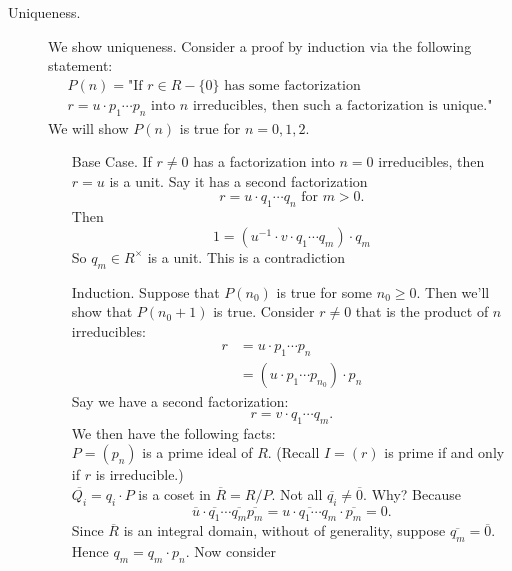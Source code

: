 \documentclass[12pt,letterpaper]{algebra_book}
\theoremstyle{definition}
\begin{document}
\begin{prf}
\begin{description}
        \item[Uniqueness.] We show uniqueness. Consider a proof by
        induction via the following statement:
        \begin{align*}
            P(n) = \text{"If } r \in R - \{0\} \text{ has some factorization }\\ 
            r=u\cdot p_1\cdots p_n \text{ into }  n
            \text{ irreducibles, then such a factorization is unique."}
        \end{align*}
        We will show $P(n)$ is true for $n=0,1,2$. 
        \begin{itemize}
            \item[Base Case.] If $r \ne 0$ has a factorization into
            $n = 0$ irreducibles, then $r = u$ is a unit. Say it
            has a second factorization 
            \[
                r = u \cdot q_1 \cdots q_n \text{  for } m>0.
            \]
            Then 
            \[
                1 = (u^{-1}\cdot v \cdot q_1 \cdots q_m)\cdot q_m
            \]
            So $q_m \in R^{\times}$ is a unit. This is a contradiction
            \item[Induction.] 
            Suppose that $P(n_0)$ is true for some $n_0 \ge 0$.
            Then we'll show that $P(n_0 + 1)$ is true. Consider $r
            \ne 0$ that is the product of $n$ irreducibles: 
            \begin{align*}
                r & = u \cdot p_1 \cdots p_n\\
                & = (u \cdot p_1 \cdots p_{n_0}) \cdot p_n
            \end{align*}
            Say we have a second factorization:
            \[
                r = v \cdot q_1 \cdots q_m.
            \]
            We then have the following facts:\\
            $P = (p_n)$ is a prime ideal of $R$. (Recall $I = (r)$
            is prime if and only if $r$ is irreducible.)\\
            $\overline{Q_i} = q_i \cdot P$ is a coset in
            $\overline{R} = R/P$.  Not all $\overline{q_i} \ne
            \overline{0}$. Why? Because 
            \[
                \overline{u} \cdot \overline{q_1} \cdots \overline{q_m}\overline{p_m} = \overline{u\cdot  q_1 \cdots q_m} \cdot \overline{p_m} = 0.
            \]
            Since $\overline{R}$ is an integral domain, without
            of generality,  suppose $\overline{q_m} =
            \overline{0}$. Hence $q_m = q_m \cdot p_n$. Now
            consider 
            \[
\]
\end{itemize}
\end{description}
\end{prf}
\end{document}
